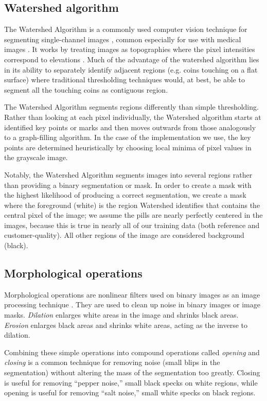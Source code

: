 \documentclass{article}
\begin{document}
\subsection{Watershed algorithm}

The Watershed Algorithm is a commonly used computer vision technique for segmenting single-channel images \cite{semantic-segmentation}, common especially for use with medical images \cite{medical}. It works by treating images as topographies where the pixel intensities correspond to elevations \cite{watershed-legit}. Much of the advantage of the watershed algorithm lies in its ability to separately identify adjacent regions (e.g. coins touching on a flat surface) where traditional thresholding techniques would, at best, be able to segment all the touching coins as contiguous region. 

The Watershed Algorithm segments regions differently than simple thresholding. Rather than looking at each pixel individually, the Watershed algorithm starts at identified key points or marks and then moves outwards from those analogously to a graph-filling algorithm. In the case of the implementation we use, the key points are determined heuristically by choosing local minima of pixel values in the grayscale image. 

Notably, the Watershed Algorithm segments images into several regions rather than providing a binary segmentation or mask. In order to create a mask with the highest likelihood of producing a correct segmentation, we create a mask where the foreground (white) is the region Watershed identifies that contains the central pixel of the image; we assume the pills are nearly perfectly centered in the images, because this is true in nearly all of our training data (both reference and customer-quality). All other regions of the image are considered background (black).

\subsection{Morphological operations}

Morphological operations are nonlinear filters used on binary images as an image processing technique \cite{cv-textbook}. They are used to clean up noise in binary images or image masks. \textit{Dilation} enlarges white areas in the image and shrinks black areas. \textit{Erosion} enlarges black areas and shrinks white areas, acting as the inverse to dilation. 

Combining these simple operations into compound operations called \textit{opening} and \textit{closing} is a common technique for removing noise (small blips in the segmentation) without altering the mass of the segmentation too greatly. Closing is useful for removing “pepper noise,” small black specks on white regions, while opening is useful for removing ``salt noise,” small white specks on black regions. 
\end{document}
